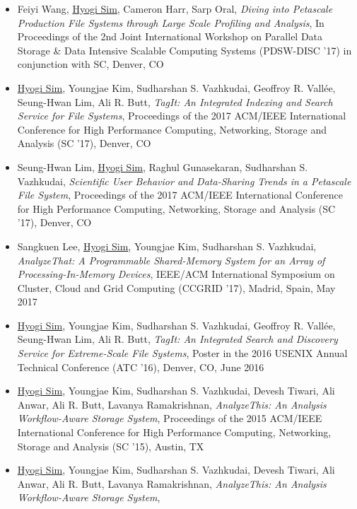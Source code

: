 \begin{itemize}
\item Feiyi Wang, \underline{Hyogi Sim}, Cameron Harr, Sarp Oral,
  {\it Diving into Petascale Production File Systems through
       Large Scale Profiling and Analysis},
  In Proceedings of the 2nd Joint International Workshop on Parallel Data Storage
  \& Data Intensive Scalable Computing Systems (PDSW-DISC '17)
  in conjunction with SC, Denver, CO
\item \underline{Hyogi Sim}, Youngjae Kim, Sudharshan S. Vazhkudai,
  Geoffroy R. Vall\'ee, Seung-Hwan Lim, Ali R. Butt,
  {\it TagIt: An Integrated Indexing and Search Service for File Systems},
  Proceedings of the 2017 ACM/IEEE International Conference for High
  Performance Computing, Networking, Storage and Analysis (SC '17), Denver, CO
\item Seung-Hwan Lim, \underline{Hyogi Sim}, Raghul Gunasekaran,
  Sudharshan S. Vazhkudai,
  {\it Scientific User Behavior and Data-Sharing Trends in a Petascale File System},
  Proceedings of the 2017 ACM/IEEE International Conference for High
  Performance Computing, Networking, Storage and Analysis (SC '17), Denver, CO
\item Sangkuen Lee, \underline{Hyogi Sim}, Youngjae Kim,
  Sudharshan S. Vazhkudai,
  {\it AnalyzeThat: A Programmable Shared-Memory System for an Array of Processing-In-Memory Devices},
  IEEE/ACM International Symposium on Cluster, Cloud and Grid Computing
  (CCGRID '17), Madrid, Spain, May 2017
\item \underline{Hyogi Sim}, Youngjae Kim, Sudharshan S. Vazhkudai,
  Geoffroy R. Vall\'ee, Seung-Hwan Lim, Ali R. Butt,
  {\it TagIt: An Integrated Search and Discovery Service for Extreme-Scale File
  Systems},
  Poster in the 2016 USENIX Annual Technical Conference (ATC '16),
  Denver, CO, June 2016 %
\item \underline{Hyogi Sim}, Youngjae Kim, Sudharshan S. Vazhkudai,
  Devesh Tiwari, Ali Anwar, Ali R. Butt, Lavanya Ramakrishnan,
  {\it AnalyzeThis: An Analysis Workflow-Aware Storage System},
  Proceedings of the 2015 ACM/IEEE International Conference for High
  Performance Computing, Networking, Storage and Analysis (SC '15), Austin, TX
\item \underline{Hyogi Sim}, Youngjae Kim, Sudharshan S. Vazhkudai,
  Devesh Tiwari, Ali Anwar, Ali R. Butt, Lavanya Ramakrishnan,
  {\it AnalyzeThis: An Analysis Workflow-Aware Storage System},

\end{itemize}
